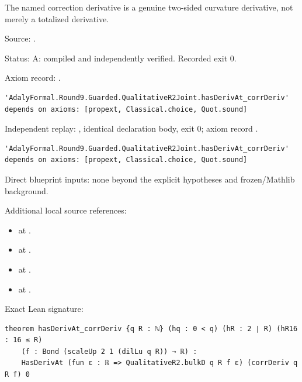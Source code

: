\begin{theorem}[bp-117]
\label{bp-117}
\uses{}
\leanok
The named correction derivative is a genuine two-sided curvature derivative, not merely a totalized derivative.

\par Source: \texttt{}.
\par Status: A: compiled and independently verified. Recorded exit 0.
\par Axiom record: \texttt{}.
\begin{verbatim}
'AdalyFormal.Round9.Guarded.QualitativeR2Joint.hasDerivAt_corrDeriv' depends on axioms: [propext, Classical.choice, Quot.sound]
\end{verbatim}
\par Independent replay: \texttt{}, identical declaration body, exit 0; axiom record \texttt{}.
\begin{verbatim}
'AdalyFormal.Round9.Guarded.QualitativeR2Joint.hasDerivAt_corrDeriv' depends on axioms: [propext, Classical.choice, Quot.sound]
\end{verbatim}
\par Direct blueprint inputs: none beyond the explicit hypotheses and frozen/Mathlib background.
\par Additional local source references:
\begin{itemize}
\item \texttt{} at \texttt{}.
\item \texttt{} at \texttt{}.
\item \texttt{} at \texttt{}.
\item \texttt{} at \texttt{}.
\end{itemize}
\par Exact Lean signature:
\begin{verbatim}
theorem hasDerivAt_corrDeriv {q R : ℕ} (hq : 0 < q) (hR : 2 ∣ R) (hR16 : 16 ≤ R)
    (f : Bond (scaleUp 2 1 (dilLu q R)) → ℝ) :
    HasDerivAt (fun ε : ℝ => QualitativeR2.bulkD q R f ε) (corrDeriv q R f) 0
\end{verbatim}
\end{theorem}

